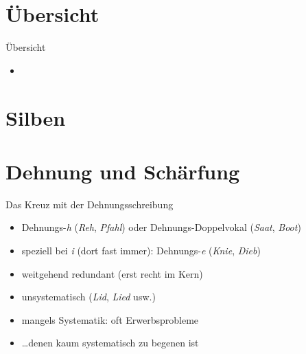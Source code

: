 \section{Übersicht}

\begin{frame}
  {Übersicht}
  \onslide<+->
  \begin{itemize}[<+->]
    \item \citet{Schaefer2018b}
  \end{itemize}
\end{frame}

\section{Silben}



\section{Dehnung und Schärfung}

\begin{frame}
  {Das Kreuz mit der Dehnungsschreibung}
  \pause
  \begin{itemize}[<+->]
    \item Dehnungs-\textit{h} (\textit{Reh}, \textit{Pfahl}) oder Dehnungs-Doppelvokal (\textit{Saat}, \textit{Boot})
    \item speziell bei \textit{i} (dort fast immer): Dehnungs-\textit{e} (\textit{Knie}, \textit{Dieb})
      \Halbzeile
    \item \alert{weitgehend redundant} (erst recht im Kern)
    \item \alert{unsystematisch} (\textit{Lid}, \textit{Lied} usw.)
      \Halbzeile
    \item mangels Systematik: \alert{oft Erwerbsprobleme}
    \item \ldots denen kaum systematisch zu begenen ist
  \end{itemize}
\end{frame}

